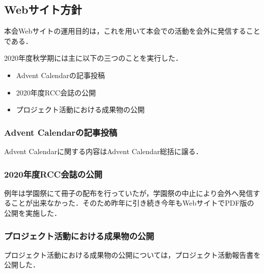 \subsection*{Webサイト方針}


本会Webサイトの運用目的は，これを用いて本会での活動を会外に発信することである．

2020年度秋学期には主に以下の三つのことを実行した．
\begin{itemize}
\item Advent Calendarの記事投稿
\item 2020年度RCC会誌の公開
\item プロジェクト活動における成果物の公開
\end{itemize}

\subsubsection*{Advent Calendarの記事投稿}
Advent Calendarに関する内容はAdvent Calendar総括に譲る．

\subsubsection*{2020年度RCC会誌の公開}
例年は学園祭にて冊子の配布を行っていたが，学園祭の中止により会外へ発信することが出来なかった．そのため昨年に引き続き今年もWebサイトでPDF版の公開を実施した．

\subsubsection*{プロジェクト活動における成果物の公開}
プロジェクト活動における成果物の公開については，プロジェクト活動報告書を公開した．
